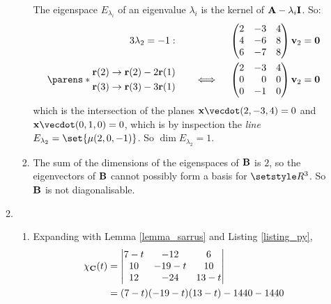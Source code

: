 \documentclass[fleqn,a4paper,11pt]{article}
\begin{document}
\begin{enumerate}[label=\textbf{\arabic*.}]
\begin{enumerate}[label=(\textbf{\Alph*})]
\begin{enumerate}[label=(\roman*)]
       The eigenspace \(E_{\lambda_i}\) of an eigenvalue
       \(\lambda_i\) is the kernel of \(\mathbf{A} - \lambda_i \mathbf{I}\). So:
       \begin{alignat*}3
        \lambda_2 = -1:\quad
        && &&\begin{pmatrix*}[r]
         2 & -3 & 4 \\
         4 & -6 & 8 \\
         6 & -7 & 8
        \end{pmatrix*}
        \vec v_2 &= \vec 0 \\
        \parens*{
         \begin{aligned}
          \vec r(2) &\to \vec r(2) - 2 \vec r(1) \\
          \vec r(3) &\to \vec r(3) - 3 \vec r(1)
         \end{aligned}
        } \quad
        &&\iff{}&&\begin{pmatrix*}[r]
         2 & -3 & 4 \\
         0 & 0 & 0 \\
         0 & -1 & 0
        \end{pmatrix*}
        \vec v_2 &= \vec 0
       \end{alignat*}
       which is the intersection of the planes
       \(\vec x \vecdot (2, -3, 4) = 0\) and
       \(\vec x \vecdot (0, 1, 0) = 0\), which is by inspection the \emph{line}
       \(E_{\lambda_2} = \set{\mu(2, 0, -1)}\). So
       \(\dim E_{\lambda_2} = 1\).
      \item
       The sum of the dimensions of the eigenspaces of \(\mathbf{B}\) is \(2\), so
       the eigenvectors of \(\mathbf{B}\) cannot possibly form a basis for
       \(\Reals^3\). So \(\mathbf{B}\) is not diagonalisable.
     \end{enumerate}
    \item
     \begin{enumerate}[label=(\roman*)]
      \item
       Expanding with Lemma \ref{lemma_sarrus} and
       Listing \ref{listing_py},
       \begin{align*}
        \chi_{\mat C}(t)
         &= \begin{vmatrix}
          7 - t & -12 & 6 \\
          10 & -19 - t & 10 \\
          12 & -24 & 13 - t
         \end{vmatrix} \\
         &= (7 - t)(-19 - t)(13 - t) - 1440 - 1440 \\

\end{align*}
\end{enumerate}
\end{enumerate}
\end{enumerate}
\end{document}
